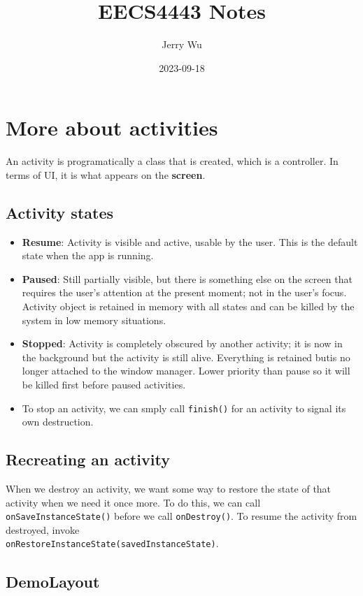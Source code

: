 \documentclass[12pt]{book}
\title{EECS4443 Notes}
\author{Jerry Wu}
\date{2023-09-18}
\begin{document}
\maketitle

\section*{More about activities}

An activity is programatically a class that is created, which is a controller. In terms of UI, it is what appears on the \textbf{screen}.

\subsection*{Activity states}

\begin{itemize}
  \item \textbf{Resume}: Activity is visible and active, usable by the user. This is the default state when the app is running.
  \item \textbf{Paused}: Still partially visible, but there is something else on the screen that requires the user's attention at the present moment; not in the user's focus. Activity object is retained in memory with all states and can be killed by the system in low memory situations.
  \item \textbf{Stopped}: Activity is completely obscured by another activity; it is now in the background but the activity is still alive. Everything is retained butis no longer attached to the window manager. Lower priority than pause so it will be killed first before paused activities.
  \item To stop an activity, we can smply call \texttt{finish()} for an activity to signal its own destruction.
\end{itemize}

\subsection*{Recreating an activity}

When we destroy an activity, we want some way to restore the state of that activity when we need it once more. To do this, we can call \texttt{onSaveInstanceState()} before we call \texttt{onDestroy()}. To resume the activity from destroyed, invoke\\ \texttt{onRestoreInstanceState(savedInstanceState)}.


\subsection*{DemoLayout}
\end{document}
